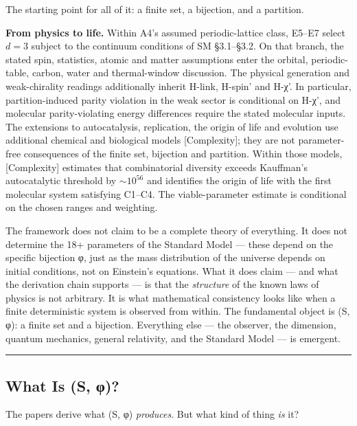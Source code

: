 \documentclass[
]{article}
\begin{document}
The starting point for all of it: a finite set, a bijection, and a
partition.

\textbf{From physics to life.} Within A4's assumed periodic-lattice
class, E5--E7 select \(d=3\) subject to the continuum conditions of SM
§3.1--§3.2. On that branch, the stated spin, statistics, atomic and
matter assumptions enter the orbital, periodic-table, carbon, water and
thermal-window discussion. The physical generation and weak-chirality
readings additionally inherit H-link, H-spin' and H-χ'. In particular,
partition-induced parity violation in the weak sector is conditional on
H-χ', and molecular parity-violating energy differences require the
stated molecular inputs. The extensions to autocatalysis, replication,
the origin of life and evolution use additional chemical and biological
models {[}Complexity{]}; they are not parameter-free consequences of the
finite set, bijection and partition. Within those models,
{[}Complexity{]} estimates that combinatorial diversity exceeds
Kauffman's autocatalytic threshold by \(\sim 10^{56}\) and identifies
the origin of life with the first molecular system satisfying C1--C4.
The viable-parameter estimate is conditional on the chosen ranges and
weighting.

The framework does not claim to be a complete theory of everything. It
does not determine the 18+ parameters of the Standard Model --- these
depend on the specific bijection φ, just as the mass distribution of the
universe depends on initial conditions, not on Einstein's equations.
What it does claim --- and what the derivation chain supports --- is
that the \emph{structure} of the known laws of physics is not arbitrary.
It is what mathematical consistency looks like when a finite
deterministic system is observed from within. The fundamental object is
(S, φ): a finite set and a bijection. Everything else --- the observer,
the dimension, quantum mechanics, general relativity, and the Standard
Model --- is emergent.

\begin{center}\rule{0.5\linewidth}{0.5pt}\end{center}

\hypertarget{what-is-s-ux3c6}{%
\subsection{What Is (S, φ)?}\label{what-is-s-ux3c6}}

The papers derive what (S, φ) \emph{produces}. But what kind of thing
\emph{is} it?
\end{document}
